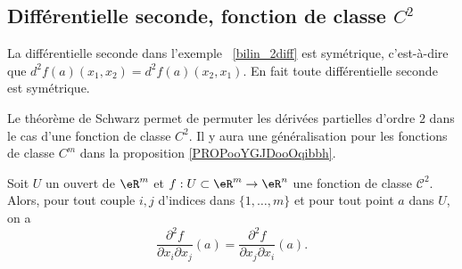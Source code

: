 \subsection{Différentielle seconde, fonction de classe \texorpdfstring{\(  C^2\)}{C2}}

La différentielle seconde dans l'exemple ~\ref{bilin_2diff} est symétrique, c'est-à-dire que \( d^2f(a)(x_1,x_2)=d^2f(a)(x_2,x_1)\). En fait toute différentielle seconde est symétrique.

Le théorème de Schwarz permet de permuter les dérivées partielles d'ordre \( 2\) dans le cas d'une fonction de classe \( C^2\). Il y aura une généralisation pour les fonctions de classe \( C^m\) dans la proposition \ref{PROPooYGJDooOqibbh}.
\begin{theorem}[Schwarz]\label{Schwarz}
	Soit \( U\) un ouvert de \( \eR^m\) et  \( f:U\subset\eR^m\to \eR^n\) une fonction de classe \( \mathcal{C}^2\). Alors, pour tout couple \( i,j\) d'indices dans \( \{1,\ldots, m\}\) et pour tout point \( a\) dans \( U\), on a
	\[
		\frac{\partial^2 f}{\partial  x_i\partial x_j}(a)=\frac{\partial^2 f}{\partial  x_j\partial x_i}(a).
	\]
\end{theorem}
